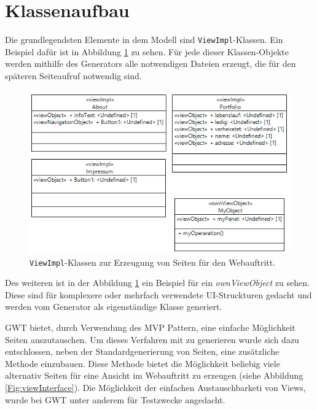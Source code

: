 \newpage
\section{Klassenaufbau}
Die grundlegendsten Elemente in dem Modell sind \texttt{ViewImpl}-Klassen. Ein
Beispiel dafür ist in Abbildung \ref{Fig:viewimpl} zu sehen. Für jede dieser
Klassen-Objekte werden mithilfe des Generators alle notwendigen Dateien
erzeugt, die für den späteren Seiteaufruf notwendig sind.

\begin{figure}[htbp]
\begin{center}
\includegraphics[width=1.0\textwidth]{./img/GWT-Model-Views-alg.png}
\caption{\texttt{ViewImpl}-Klassen zur Erzeugung von Seiten
für den Webauftritt.}\label{Fig:viewimpl}
\end{center}
\end{figure}

Des weiteren ist in der Abbildung \ref{Fig:viewimpl} ein Beispiel für ein
\textit{ownViewObject} zu sehen. Diese sind für komplexere oder mehrfach
verwendete UI-Struckturen gedacht und werden vom Generator als eigenständige
Klasse generiert.

GWT bietet, durch Verwendung des MVP Pattern, eine einfache Möglichkeit Seiten
auszutauschen. Um dieses Verfahren mit zu generieren wurde sich dazu
entschlossen, neben der Standardgenerierung von Seiten, eine zusätzliche
Methode einzubauen. Diese Methode bietet die Möglichkeit beliebig viele
alternativ Seiten für eine Ansicht im Webauftritt zu erzeugen (siehe Abbildung
\ref{Fig:viewInterface}). Die Möglichkeit der einfachen Austauschbarketi von
Views, wurde bei GWT unter anderem für Testzwecke angedacht.

